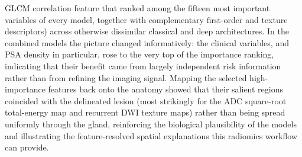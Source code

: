 \documentclass[11pt]{article}
\begin{document}
GLCM correlation feature that ranked among the fifteen most important variables of
every model, together with complementary first-order and texture descriptors)
across otherwise dissimilar classical and deep architectures. In the combined models the picture changed
informatively: the clinical variables, and PSA density in particular, rose to
the very top of the importance ranking, indicating that their benefit came from
largely independent risk information rather than from refining the imaging signal.
Mapping the selected high-importance features back onto the anatomy showed that
their salient regions coincided with the delineated lesion (most strikingly for
the ADC square-root total-energy map and recurrent DWI texture maps) rather than
being spread uniformly through the gland, reinforcing the biological plausibility of
the models and illustrating the feature-resolved spatial explanations this
radiomics workflow can provide.
\end{document}
